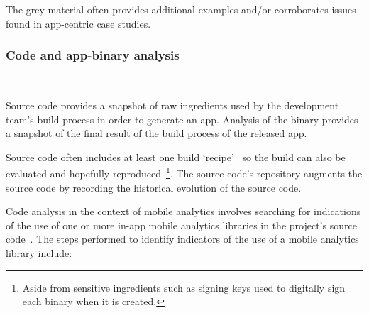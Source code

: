 The grey material often provides additional examples and/or corroborates issues found in app-centric case studies.

\subsubsection{Code and app-binary analysis}~\label{section-code-analysis-research-method}   


Source code provides a snapshot of raw ingredients used by the development team's build process in order to generate an app. Analysis of the binary provides a snapshot of the final result of the build process of the released app.

Source code often includes at least one build `recipe'~ so the build can also be evaluated and hopefully reproduced~\footnote{Aside from sensitive ingredients such as signing keys used to digitally sign each binary when it is created.}. The source code's repository augments the source code by recording the historical evolution of the source code.

Code analysis in the context of mobile analytics involves searching for indications of the use of one or more in-app mobile analytics libraries in the project's source code~. The steps performed to identify indicators %
of the use of a mobile analytics library include:

